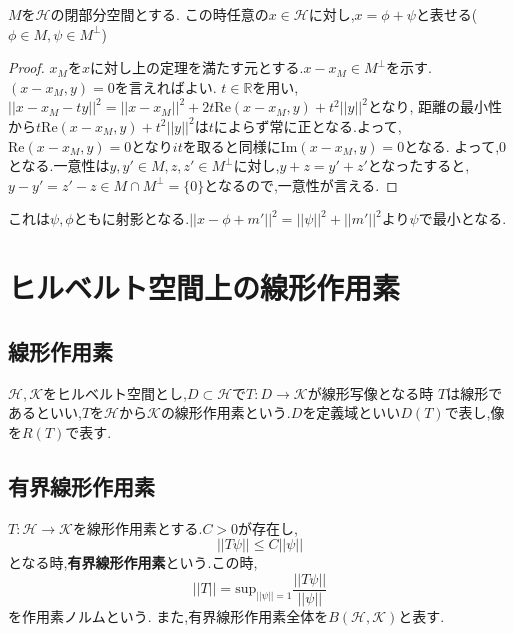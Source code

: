 \documentclass[uplatex]{jsbook}
\begin{document}
\begin{thm}[正射影定理]
$M$を$\mathcal{H}$の閉部分空間とする.
この時任意の$x \in \mathcal{H}$に対し,$x = \phi + \psi$と表せる($\phi \in M, \psi \in M^{\perp}$)
\end{thm}
\begin{proof}
$x_M$を$x$に対し上の定理を満たす元とする.$x - x_M \in M^{\perp}$を示す.
$(x - x_M, y) = 0$を言えればよい.
$t \in \mathbb{R}$を用い,$||x - x_M - ty||^2 = ||x - x_M||^2 + 2t\mathrm{Re}(x - x_M, y) + t^2 ||y||^2$となり,
距離の最小性から$t\mathrm{Re}(x - x_M, y) + t^2 ||y||^2$は$t$によらず常に正となる.よって,$\mathrm{Re}(x - x_M, y) = 0$となり$it$を取ると同様に$\mathrm{Im}(x - x_M, y) = 0$となる.
よって,0となる.一意性は$y,y' \in M, z, z' \in M^{\perp}$に対し,$y + z = y' + z'$となったすると,$y - y' = z' -z \in M \cap M^{\perp} = \{0\}$となるので,一意性が言える.
\end{proof}
これは$\psi, \phi$ともに射影となる.$||x -  \phi + m'||^2 =  ||\psi||^2 + ||m'||^2$より$\psi$で最小となる.

\chapter{ヒルベルト空間上の線形作用素}
\section{線形作用素}
$\mathcal{H}, \mathcal{K}$をヒルベルト空間とし,$D \subset \mathcal{H}$で$T:D \to \mathcal{K}$が線形写像となる時
$T$は線形であるといい,$T$を$\mathcal{H}$から$\mathcal{K}$の線形作用素という.$D$を定義域といい$D(T)$で表し,像を$R(T)$で表す.

\section{有界線形作用素}
\begin{screen}
\begin{dfn}
 $T: \mathcal{H} \to \mathcal{K}$を線形作用素とする.$C > 0$が存在し,
 \begin{equation*}
  ||T\psi || \le C || \psi ||
 \end{equation*}
となる時,\textbf{有界線形作用素}という.この時,
\begin{equation*}
  ||T|| = \mathrm{sup}_{||\psi|| = 1} \frac{||T\psi||}{||\psi||}
\end{equation*}
を作用素ノルムという.
また,有界線形作用素全体を$B(\mathcal{H}, \mathcal{K})$と表す.
\end{dfn}
\end{screen}
\end{document}
